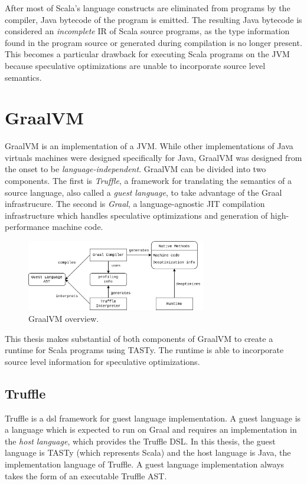 After most of Scala's language constructs are eliminated from programs by the compiler, Java bytecode of the program is emitted.
The resulting Java bytecode is considered an \textit{incomplete} IR of Scala source programs, as the type information found in the program source or generated during compilation is no longer present.
This becomes a particular drawback for executing Scala programs on the JVM because speculative optimizations are unable to incorporate source level semantics.

\section{GraalVM}

GraalVM\cite{java:graalvm} is an implementation of a JVM.
While other implementations of Java virtuals machines were designed specifically for Java, GraalVM was designed from the onset to be \textit{language-independent}.
GraalVM can be divided into two components. 
The first is \textit{Truffle}, a framework for translating the semantics of a source language, also called a \textit{guest language}, to take advantage of the Graal infrastrucure.
The second is \textit{Graal}, a language-agnostic JIT compilation infrastructure which handles speculative optimizations and generation of high-performance machine code.

\begin{figure}[!htb]
	\centering
	\includegraphics[width=0.7\textwidth]{figures/graalvm-pipeline.png}
	\caption{GraalVM overview\cite{graalvm:ir}.}
\end{figure}

This thesis makes substantial of both components of GraalVM to create a runtime for Scala programs using TASTy.
The runtime is able to incorporate source level information for speculative optimizations.

\subsection{Truffle}

Truffle is a \acrfull{dsl} framework for guest language implementation.
A guest language is a language which is expected to run on Graal and requires an implementation in the \textit{host language}, which provides the Truffle DSL.
In this thesis, the guest language is TASTy (which represents Scala) and the host language is Java, the implementation language of Truffle.
A guest language implementation always takes the form of an executable Truffle AST.


